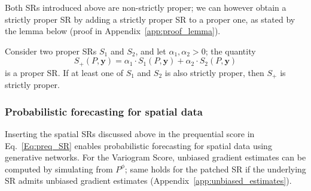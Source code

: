 \documentclass[twoside,11pt]{article}
\newcommand{\ddobs}{\mathbf{y}}
\begin{document}
	Both SRs introduced above are non-strictly proper; 
	we can however obtain a strictly proper SR by adding a strictly proper SR to a proper one,
	as stated by the lemma below (proof in Appendix~\ref{app:proof_lemma}).
	\begin{lemma}\label{lemma:additive_SR}
		Consider two proper SRs $S_1$ and $S_2$, and let $ \alpha_1, \alpha_2 > 0 $; the quantity
		$$S_+(P,\ddobs) = \alpha_1 \cdot S_1(P,\ddobs) + \alpha_2 \cdot S_2(P,\ddobs)$$
		is a proper SR. If at least one of $S_1$ and $S_2$ is also strictly proper, then $S_+$ is strictly proper.\end{lemma}
	
	
	
	
	
	
	
	
	
	\subsubsection{Probabilistic forecasting for spatial data}
	
	Inserting the spatial SRs discussed above in the prequential score in Eq.~\eqref{Eq:preq_SR} enables probabilistic forecasting for spatial data using generative networks.
	For the Variogram Score, unbiased gradient estimates can be computed by simulating from $ P^\phi $; same holds for the patched SR if the underlying SR admits unbiased gradient estimates (Appendix~\ref{app:unbiased_estimates}).
	
	
	
	
	
	
	
	
	
	
	
	
	
	
	
	
	
	
	
	
	
	
	
	
	
	
	
	
	
	
	
	
	
	
	
	
	
	
	
	
	
\end{document}

